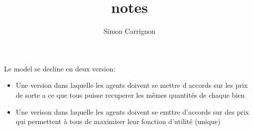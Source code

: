 \documentclass[a4paper]{article}
\title{notes}
\author{Simon Carrignon}
\begin{document}
Le model se decline en deux version:

\begin{itemize}
    \item Une version dans laquelle les agents doivent se mettre d accords sur les prix de sorte a ce que tous puisse recuperer les mêmes quantités de chaque bien
    \item Une verison dans laquelle  les agents doivent se emttre d'accords sur des prix qui permettent à tous de maximiser leur fonction d'utilité (unique)
\end{itemize}
\end{document}
